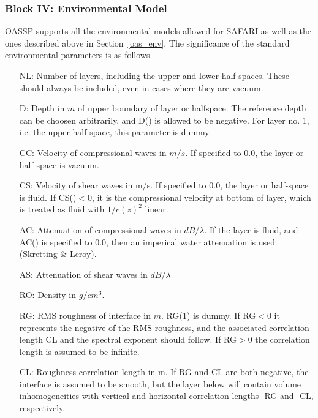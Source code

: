 \subsubsection{Block IV: Environmental Model}

OASSP supports all the environmental models allowed for SAFARI as well as the
ones described above in Section~\ref{oas_env}.  The significance of
the standard environmental parameters is as follows
\begin{itemize}	
		\item[NL:]	Number of layers, including the upper and lower
		half-spaces. These should always be included,
		even in cases where they are vacuum.

		\item[D:]	Depth in $m$ of upper boundary of layer or
		halfspace. The reference depth can be choosen
		arbitrarily, and D() is allowed to be negative.
		For layer no. 1, i.e. the upper half-space, this
     		parameter is dummy.

		\item[CC:]	Velocity of compressional waves in $m/s$.
        	If specified to 0.0, the layer or half-space is
		vacuum.

		\item[CS:]	Velocity of shear waves in m/s.
 		If specified to 0.0, the layer or half-space is fluid.
                If CS()$< 0$, it is the compressional velocity at bottom of
		layer, which is treated as fluid with $1/c(z)^{2}$ linear.

		\item[AC:]   Attenuation of compressional waves in 
		$dB/\lambda$. If the layer is fluid, and AC() is specified to
		0.0, then an imperical water attenuation is
		used (Skretting \& Leroy).

		\item[AS:]   Attenuation of shear waves in $dB/\lambda$

		\item[RO:]   Density in $g/cm^{3}$.

		\item[RG:] RMS roughness of interface in $m$. RG(1) is
		dummy. If RG$<0$ it represents the negative of the RMS
		roughness, and the associated correlation length CL and the spectral exponent 
		should follow. If RG$>0$ the correlation length is
		assumed to be infinite.  

                \item[CL:] Roughness correlation length in m. If
		RG and CL are both negative, the interface is assumed to be
		smooth, but the layer below will contain volume
		inhomogeneities with vertical and horizontal
		correlation lengths -RG and -CL, respectively. 


\end{itemize}
